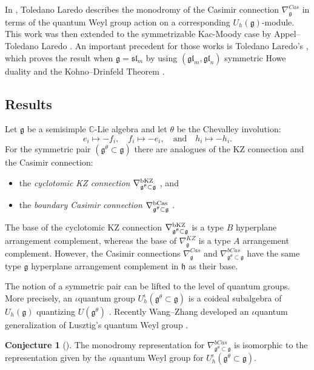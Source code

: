 \documentclass[10pt]{amsart}
\numberwithin{equation}{section}
\theoremstyle{definition}
\newtheorem{conjecture}[theorem]{Conjecture}
\def\C{{\mathbb C}}
\newcommand{\gln}[1][n]{\mathfrak{gl}_{#1}}
\newcommand{\slm}{\mathfrak{sl}_{m}}
\newcommand{\glm}{\mathfrak{gl}_{m}}
\newcommand{\g}{\mathfrak{g}}
\newcommand{\h}{\mathfrak{h}}
\begin{document}
In \cite{toledanolaredo2016quasicoxeterquasitriangularquasibialgebrascasimir}, Toledano Laredo describes the monodromy of the Casimir connection $\nabla_{\g}^{Cas}$ in terms of the quantum Weyl group action on a corresponding $U_h(\mathfrak{g})$-module. This work was then extended to the symmetrizable Kac-Moody case by Appel--Toledano Laredo \cite{MR4728239}. An important precedent for those works is Toledano Laredo's \cite[Theorem 7.1]{Valerio-qWeyl}, which proves the result when $\g=\slm$ by using $(\glm,\gln)$ symmetric Howe duality and the Kohno--Drinfeld Theorem \cite{Drinfeld2,Koh1}.

\subsection{Results}

Let $\g$ be a semisimple $\C$-Lie algebra and let $\theta$ be the Chevalley involution:
\[
e_i\mapsto -f_i, \quad f_i\mapsto -e_i, \quad \text{and} \quad h_i \mapsto -h_i.
\]
For the symmetric pair $(\g^{\theta}\subset \g)$ there are analogues of the KZ connection and the Casimir connection: 
\begin{itemize}
    \item the \emph{cyclotomic KZ connection} $\nabla^{{\rm bKZ}}_{\mathfrak{g}^{\theta}\subset \mathfrak{g}}$ \cite{MR2383601}, and
    \item the \emph{boundary Casimir connection} $\nabla^{{\rm bCas}}_{\mathfrak{g}^{\theta}\subset \mathfrak{g}}$ \cite{MR4983792}.
\end{itemize}
The base of the cyclotomic KZ connection $\nabla^{{\rm bKZ}}_{\mathfrak{g}^{\theta}\subset \mathfrak{g}}$ is a type $B$ hyperplane arrangement complement, whereas the base of $\nabla_{\g}^{KZ}$ is a type $A$ arrangement complement. However, the Casimir connections $\nabla_{\g}^{Cas}$ and $\nabla_{\g^{\theta}\subset \g}^{bCas}$ have the same type $\g$ hyperplane arrangement complement in $\h$ as their base.

The notion of a symmetric pair can be lifted to the level of quantum groups. More precisely, an $\iota$quantum group $U_h^{\iota}(\mathfrak{g}^{\theta}\subset \mathfrak{g})$ is a coideal subalgebra of $U_h(\mathfrak{g})$ quantizing $U(\mathfrak{g}^{\theta})$ \cite{W22}. Recently Wang--Zhang developed an $\iota$quantum generalization of Lusztig's quantum Weyl group \cite{WW25}.

\begin{conjecture}[{\cite[Conjecture 8.10]{MR4983792}}]\label{conj1}
    The monodromy representation for $\nabla_{\g^{\theta}\subset \g}^{bCas}$ is isomorphic to the representation given by the $\iota$quantum Weyl group for $U_h^{\iota}(\g^{\theta}\subset \g)$. 
\end{conjecture}
\end{document}
